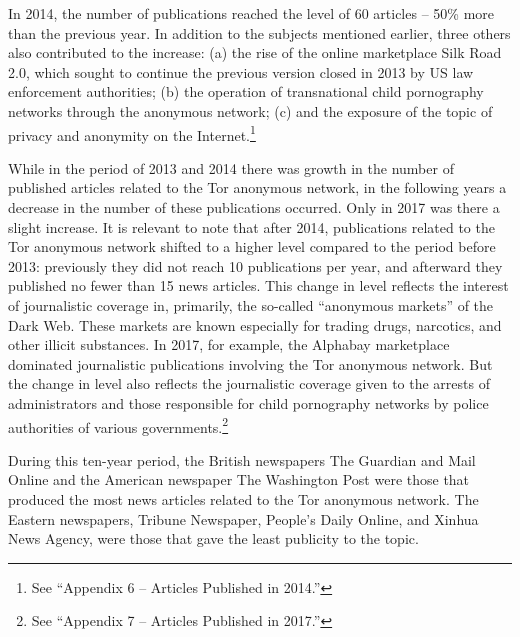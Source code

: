 In 2014, the number of publications reached the level of 60 articles -- 50\% more than the previous year. In addition to the subjects mentioned earlier, three others also contributed to the increase: (a) the rise of the online marketplace Silk Road 2.0, which sought to continue the previous version closed in 2013 by US law enforcement authorities; (b) the operation of transnational child pornography networks through the anonymous network; (c) and the exposure of the topic of privacy and anonymity on the Internet.\footnote{See ``Appendix 6 -- Articles Published in 2014.''}

While in the period of 2013 and 2014 there was growth in the number of published articles related to the Tor anonymous network, in the following years a decrease in the number of these publications occurred. Only in 2017 was there a slight increase. It is relevant to note that after 2014, publications related to the Tor anonymous network shifted to a higher level compared to the period before 2013: previously they did not reach 10 publications per year, and afterward they published no fewer than 15 news articles. This change in level reflects the interest of journalistic coverage in, primarily, the so-called ``anonymous markets'' of the Dark Web. These markets are known especially for trading drugs, narcotics, and other illicit substances. In 2017, for example, the Alphabay marketplace dominated journalistic publications involving the Tor anonymous network. But the change in level also reflects the journalistic coverage given to the arrests of administrators and those responsible for child pornography networks by police authorities of various governments.\footnote{See ``Appendix 7 -- Articles Published in 2017.''}

During this ten-year period, the British newspapers The Guardian and Mail Online and the American newspaper The Washington Post were those that produced the most news articles related to the Tor anonymous network. The Eastern newspapers, Tribune Newspaper, People's Daily Online, and Xinhua News Agency, were those that gave the least publicity to the topic.

